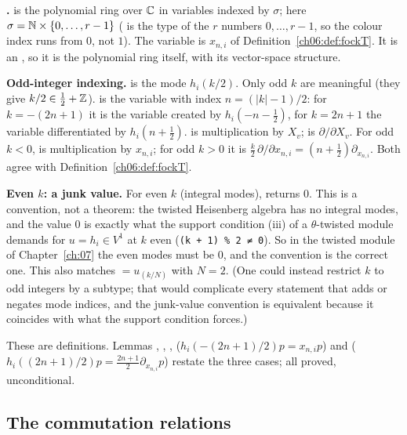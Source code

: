 \begin{dictionary}
\textbf{.}   is the polynomial ring over ${\mathbb{C}}$ in variables
indexed by $\sigma$; here $\sigma={\mathbb{N}}\times\{0,\dots,r-1\}$ ( is the type of the $r$
numbers $0,\dots,r-1$, so the colour index runs from $0$, not $1$).  The variable 
is $x_{n,i}$ of Definition~\ref{ch06:def:fockT}.  It is an , so it is the polynomial
ring itself, with its vector-space structure.

\textbf{Odd-integer indexing.}   is the mode $h_i(k/2)$.  Only odd $k$ are
meaningful (they give $k/2\in\frac12+{\mathbb{Z}}$).   is the variable with index
$n=(|k|-1)/2$: for $k=-(2n+1)$ it is the variable created by $h_i(-n-\frac12)$, for $k=2n+1$ the
variable differentiated by $h_i(n+\frac12)$.   is multiplication by $X_v$;
 is $\partial/\partial X_v$.  For odd $k<0$,  is multiplication by
$x_{n,i}$; for odd $k>0$ it is $\frac k2\,\partial/\partial x_{n,i}=(n+\frac12)\partial_{x_{n,i}}$.
Both agree with Definition~\ref{ch06:def:fockT}.

\textbf{Even $k$: a junk value.}  For even $k$ (integral modes),  returns $0$.  This is
a convention, not a theorem: the twisted Heisenberg algebra has no integral modes, and the value
$0$ is exactly what the support condition (iii) of a $\theta$-twisted module demands for
$u=h_i\in V^1$ at $k$ even (\texttt{(k + 1) \% 2 ≠ 0}).  So in the twisted module of
Chapter~\ref{ch:07} the even modes must be $0$, and the convention is the correct one.  This also
matches  $=u_{(k/N)}$ with $N=2$.  (One could instead restrict $k$ to odd integers by a subtype; that would complicate every
statement that adds or negates mode indices, and the junk-value convention is equivalent because it
coincides with what the support condition forces.)
\end{dictionary}
\begin{status}
These are definitions.  Lemmas , , ,
 ($h_i(-(2n+1)/2)p=x_{n,i}p$) and 
($h_i((2n+1)/2)p=\frac{2n+1}2\partial_{x_{n,i}}p$) restate the three cases; all proved,
unconditional.
\end{status}

\subsection{The commutation relations}

